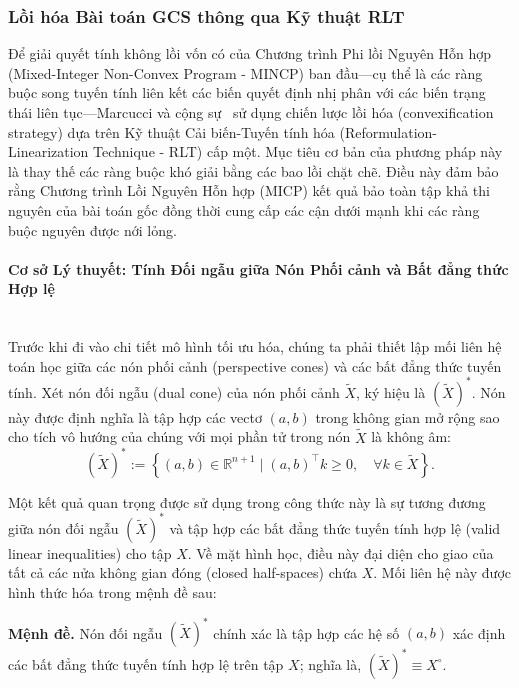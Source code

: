 \subsubsection{Lồi hóa Bài toán GCS thông qua Kỹ thuật RLT}

Để giải quyết tính không lồi vốn có của Chương trình Phi lồi Nguyên Hỗn hợp (Mixed-Integer Non-Convex Program - MINCP) ban đầu—cụ thể là các ràng buộc song tuyến tính liên kết các biến quyết định nhị phân với các biến trạng thái liên tục—Marcucci và cộng sự~\cite{MarcucciEtAl2023GCS} sử dụng chiến lược lồi hóa (convexification strategy) dựa trên Kỹ thuật Cải biến-Tuyến tính hóa (Reformulation-Linearization Technique - RLT) cấp một. Mục tiêu cơ bản của phương pháp này là thay thế các ràng buộc khó giải bằng các bao lồi chặt chẽ. Điều này đảm bảo rằng Chương trình Lồi Nguyên Hỗn hợp (MICP) kết quả bảo toàn tập khả thi nguyên của bài toán gốc đồng thời cung cấp các cận dưới mạnh khi các ràng buộc nguyên được nới lỏng.

\paragraph{Cơ sở Lý thuyết: Tính Đối ngẫu giữa Nón Phối cảnh và Bất đẳng thức Hợp lệ}\mbox{}\\

Trước khi đi vào chi tiết mô hình tối ưu hóa, chúng ta phải thiết lập mối liên hệ toán học giữa các nón phối cảnh (perspective cones) và các bất đẳng thức tuyến tính. Xét nón đối ngẫu (dual cone) của nón phối cảnh $\tilde{X}$, ký hiệu là $(\tilde{X})^*$. Nón này được định nghĩa là tập hợp các vectơ $(a, b)$ trong không gian mở rộng sao cho tích vô hướng của chúng với mọi phần tử trong nón $\tilde{X}$ là không âm:
\begin{equation}
    (\tilde{X})^* := \left\{ (a, b) \in \mathbb{R}^{n+1} \mid (a, b)^\top k \ge 0, \quad \forall k \in \tilde{X} \right\}.
\end{equation}

Một kết quả quan trọng được sử dụng trong công thức này là sự tương đương giữa nón đối ngẫu $(\tilde{X})^*$ và tập hợp các bất đẳng thức tuyến tính hợp lệ (valid linear inequalities) cho tập $X$. Về mặt hình học, điều này đại diện cho giao của tất cả các nửa không gian đóng (closed half-spaces) chứa $X$. Mối liên hệ này được hình thức hóa trong mệnh đề sau:

\textbf{Mệnh đề.} Nón đối ngẫu $(\tilde{X})^*$ chính xác là tập hợp các hệ số $(a, b)$ xác định các bất đẳng thức tuyến tính hợp lệ trên tập $X$; nghĩa là, $(\tilde{X})^* \equiv X^\circ$.

